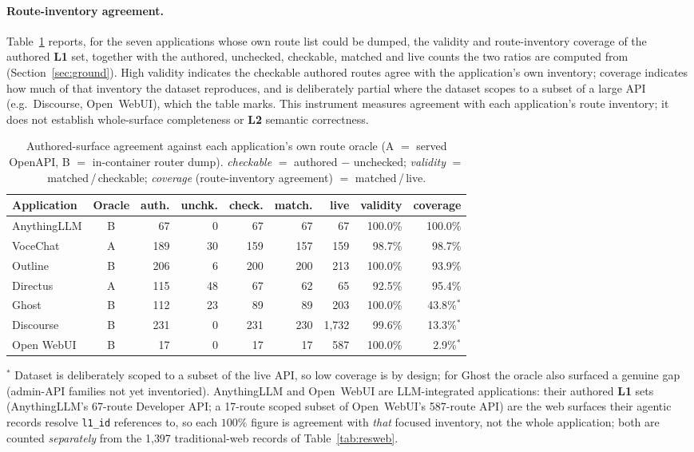 \documentclass[11pt,a4paper]{article}
\newcommand{\cd}[1]{\lstinline[basicstyle=\ttfamily\small]|#1|}
\renewcommand{\L}[1]{\textbf{L#1}}
\begin{document}
\paragraph{Route-inventory agreement.} Table~\ref{tab:complete} reports, for the seven
applications whose own route list could be dumped, the validity and route-inventory coverage
of the authored \L1 set, together with the authored, unchecked, checkable, matched and live
counts the two ratios are computed from (Section~\ref{sec:ground}). High validity indicates
the checkable authored routes agree with the application's own inventory; coverage indicates
how much of that inventory the dataset reproduces, and is deliberately partial where the
dataset scopes to a subset of a large API (e.g.\ Discourse, Open~WebUI), which the table
marks. This instrument measures agreement with each application's route inventory; it does
not establish whole-surface completeness or \L2 semantic correctness.

\begin{table}[ht]\centering\footnotesize
\caption{Authored-surface agreement against each application's own route oracle
(A $=$ served OpenAPI, B $=$ in-container router dump). \emph{checkable} $=$ authored
$-$ unchecked; \emph{validity} $=$ matched\,/\,checkable; \emph{coverage} (route-inventory
agreement) $=$ matched\,/\,live.}\label{tab:complete}
\begin{tabular}{@{}lcrrrrrrr@{}}
\toprule
\textbf{Application} & \textbf{Oracle} & \textbf{auth.} & \textbf{unchk.} &
\textbf{check.} & \textbf{match.} & \textbf{live} & \textbf{validity} & \textbf{coverage}\\
\midrule
AnythingLLM & B &  67 &  0 &  67 &  67 &      67 & 100.0\% & 100.0\%\\
VoceChat    & A & 189 & 30 & 159 & 157 &     159 &  98.7\% &  98.7\%\\
Outline     & B & 206 &  6 & 200 & 200 &     213 & 100.0\% &  93.9\%\\
Directus    & A & 115 & 48 &  67 &  62 &      65 &  92.5\% &  95.4\%\\
Ghost       & B & 112 & 23 &  89 &  89 &     203 & 100.0\% &  43.8\%$^\ast$\\
Discourse   & B & 231 &  0 & 231 & 230 & 1{,}732 &  99.6\% &  13.3\%$^\ast$\\
Open WebUI  & B &  17 &  0 &  17 &  17 &     587 & 100.0\% &   2.9\%$^\ast$\\
\bottomrule
\end{tabular}

{\footnotesize $^\ast$ Dataset is deliberately scoped to a subset of the live API, so low
coverage is by design; for Ghost the oracle also surfaced a genuine gap (admin-API families
not yet inventoried). AnythingLLM and Open~WebUI are LLM-integrated applications: their
authored \L1 sets (AnythingLLM's 67-route Developer API; a 17-route scoped subset of
Open~WebUI's 587-route API) are the web surfaces their agentic records resolve \cd{l1_id}
references to, so each $100\%$ figure is agreement with \emph{that} focused inventory, not the
whole application; both are counted \emph{separately} from the 1{,}397 traditional-web records
of Table~\ref{tab:resweb}.}
\end{table}
\end{document}
